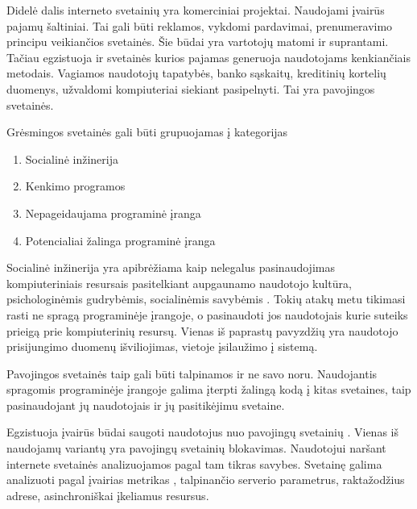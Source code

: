 
Didelė dalis interneto svetainių yra komerciniai projektai. Naudojami įvairūs pajamų šaltiniai.
Tai gali būti reklamos, vykdomi pardavimai, prenumeravimo principu veikiančios svetainės.
Šie būdai yra vartotojų matomi ir suprantami. Tačiau egzistuoja ir svetainės kurios pajamas
generuoja naudotojams kenkiančiais metodais. Vagiamos naudotojų tapatybės, banko sąskaitų, kreditinių kortelių
duomenys, užvaldomi kompiuteriai siekiant pasipelnyti. Tai yra pavojingos svetainės.


Grėsmingos svetainės gali būti grupuojamas į kategorijas \cite{gapi}
\begin{enumerate}[label=\alph*]
    \item Socialinė inžinerija
    \item Kenkimo programos
    \item Nepageidaujama programinė įranga
    \item Potencialiai žalinga programinė įranga
\end{enumerate}


Socialinė inžinerija yra apibrėžiama kaip nelegalus pasinaudojimas kompiuteriniais resursais pasitelkiant aupgaunamo
naudotojo kultūra, psichologinėmis gudrybėmis, socialinėmis savybėmis \cite{soceng}. Tokių atakų metu tikimasi rasti
ne spragą programinėje įrangoje, o pasinaudoti jos naudotojais kurie suteiks prieigą prie kompiuterinių resursų.
Vienas iš paprastų pavyzdžių yra naudotojo prisijungimo duomenų išviliojimas, vietoje įsilaužimo į sistemą.






Pavojingos svetainės taip gali būti talpinamos ir ne savo noru.
Naudojantis spragomis programinėje įrangoje galima įterpti žalingą kodą į kitas svetaines,
taip pasinaudojant jų naudotojais ir jų pasitikėjimu svetaine.

Egzistuoja įvairūs būdai saugoti naudotojus nuo pavojingų svetainių \cite{trees}.
Vienas iš naudojamų variantų yra pavojingų svetainių blokavimas.
Naudotojui naršant internete svetainės analizuojamos pagal tam tikras savybes.
Svetainę galima analizuoti pagal įvairias metrikas \cite{tangled},
talpinančio serverio parametrus, raktažodžius adrese, asinchroniškai įkeliamus resursus.

